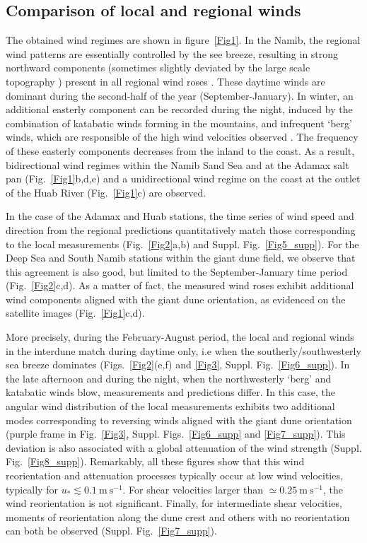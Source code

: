 \subsection{Comparison of local and regional winds}
\label{section_data_feedback}
The obtained wind regimes are shown in figure~\ref{Fig1}. In the Namib, the regional wind patterns are essentially controlled by the see breeze, resulting in strong northward components (sometimes slightly deviated by the large scale topography ) present in all regional wind roses \citep{lancaster1985}. These daytime winds are dominant during the second-half of the year (September-January). In winter, an additional easterly component can be recorded during the night, induced by the combination of katabatic winds forming in the mountains, and infrequent `berg' winds, which are responsible of the high wind velocities observed \citep{lancaster1984}. The frequency of these easterly components decreases from the inland to the coast. As a result, bidirectional wind regimes within the Namib Sand Sea and at the Adamax salt pan (Fig.~\ref{Fig1}b,d,e) and a unidirectional wind regime on the coast at the outlet of the Huab River (Fig.~\ref{Fig1}c) are observed.

In the case of the Adamax and Huab stations, the time series of wind speed and direction from the regional predictions quantitatively match those corresponding to the local measurements (Fig.~\ref{Fig2}a,b) and Suppl. Fig.~\ref{Fig5_supp}). For the Deep Sea and South Namib stations within the giant dune field, we observe that this agreement is also good, but limited to the September-January time period (Fig.~\ref{Fig2}c,d). As a matter of fact, the measured wind roses exhibit additional wind components aligned with the giant dune orientation, as evidenced on the satellite images (Fig.~\ref{Fig1}c,d).

More precisely, during the February-August period, the local and regional winds in the interdune match during daytime only, i.e when the southerly/southwesterly sea breeze dominates (Figs.~\ref{Fig2}(e,f) and \ref{Fig3}, Suppl. Fig.~\ref{Fig6_supp}). In the late afternoon and during the night, when the northwesterly `berg' and katabatic winds blow, measurements and predictions differ. In this case, the angular wind distribution of the local measurements exhibits two additional modes corresponding to reversing winds aligned with the giant dune orientation (purple frame in Fig.~\ref{Fig3}, Suppl. Figs.~\ref{Fig6_supp} and \ref{Fig7_supp}). This deviation is also associated with a global attenuation of the wind strength (Suppl. Fig.~\ref{Fig8_supp}). Remarkably, all these figures show that this wind reorientation and attenuation processes typically occur at low wind velocities, typically for $u_{*} \lesssim 0.1~\textrm{m}~\textrm{s}^{-1}$. For shear velocities larger than $\simeq 0.25~\textrm{m}~\textrm{s}^{-1}$, the wind reorientation is not significant. Finally, for intermediate shear velocities, moments of reorientation along the dune crest and others with no reorientation can both be observed (Suppl. Fig.~\ref{Fig7_supp}). 


